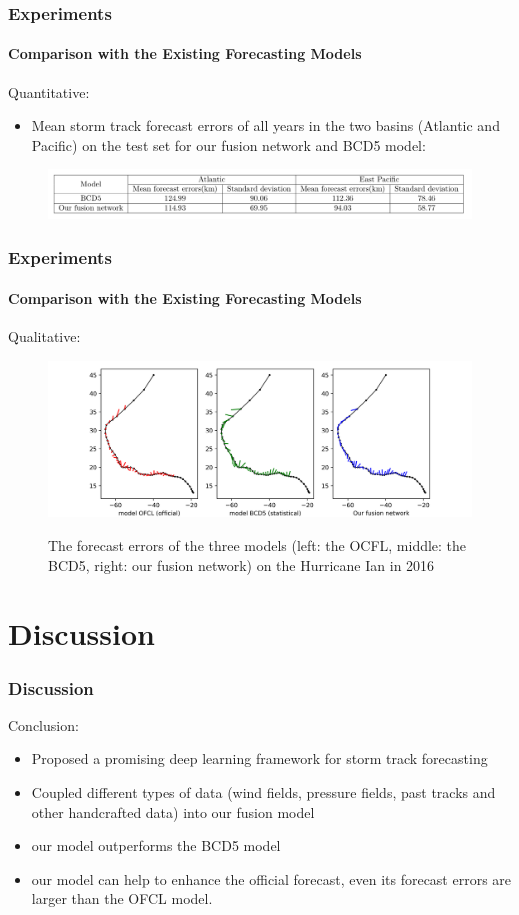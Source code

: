 \documentclass{beamer}
\begin{document}
\begin{frame}
\frametitle{Experiments}
\framesubtitle{Comparison with the Existing Forecasting Models}
Quantitative: \\
\begin{itemize}
	\item Mean storm track forecast errors of all years in the two basins (Atlantic and Pacific) on the test set for our fusion network and BCD5 model: 
\end{itemize}

\begin{figure}
	\includegraphics[width=1.0\linewidth]{figs/compare_with_baseline}\\
\end{figure}
\end{frame}

\begin{frame}
\frametitle{Experiments}
\framesubtitle{Comparison with the Existing Forecasting Models}
Qualitative: 

\begin{figure}
	\includegraphics[width=1.0\linewidth]{figs/one_stom_result.png}\\
	\caption{The forecast errors of the three models (left: the OCFL, middle: the BCD5, right: our fusion network) on the Hurricane Ian in 2016}
\end{figure}
\end{frame}




\section{Discussion}
\begin{frame}
\frametitle{Discussion}
\large{Conclusion:}

\begin{itemize}
	\item  Proposed a promising deep learning framework for storm track forecasting
	\item  Coupled different types of data (wind fields, pressure fields, past tracks and other handcrafted data) into our fusion model
	\item  our model outperforms the BCD5 model
	\item  our model can help to enhance the official forecast, even its forecast errors are larger than the OFCL model.
\end{itemize} 
\end{frame}
\end{document}
